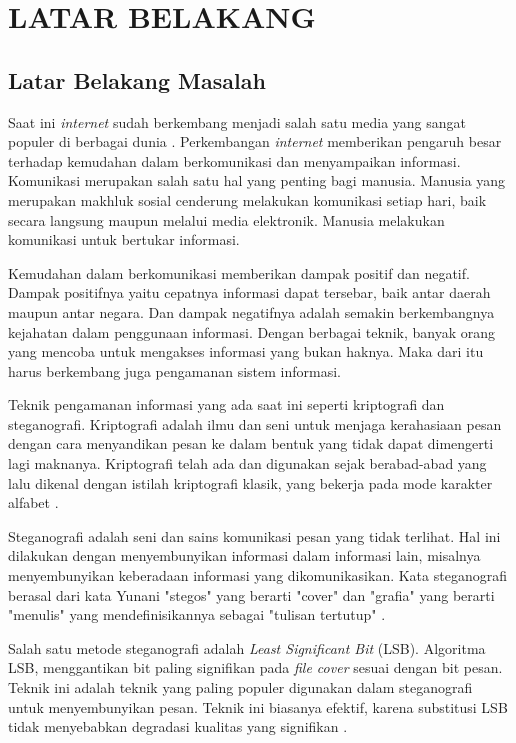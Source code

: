 
\chapter{LATAR BELAKANG}

\section{Latar Belakang Masalah}
Saat ini \emph{internet} sudah berkembang menjadi salah satu media yang sangat populer di berbagai dunia \cite{bunyamin}. Perkembangan \emph{internet} memberikan pengaruh besar terhadap kemudahan dalam berkomunikasi dan menyampaikan informasi. Komunikasi merupakan salah satu hal yang penting bagi manusia. Manusia yang merupakan makhluk sosial cenderung melakukan komunikasi setiap hari, baik secara langsung maupun melalui media elektronik. Manusia melakukan komunikasi untuk bertukar informasi.

Kemudahan dalam berkomunikasi memberikan dampak positif dan negatif. Dampak positifnya yaitu cepatnya informasi dapat tersebar, baik antar daerah maupun antar negara. Dan dampak negatifnya adalah semakin berkembangnya kejahatan dalam penggunaan informasi. Dengan berbagai teknik, banyak orang yang mencoba untuk mengakses informasi yang bukan haknya. Maka dari itu harus berkembang juga pengamanan sistem informasi.

Teknik pengamanan informasi yang ada saat ini seperti kriptografi dan steganografi. Kriptografi adalah ilmu dan seni untuk menjaga kerahasiaan pesan dengan cara menyandikan pesan  ke dalam bentuk yang tidak dapat dimengerti lagi maknanya. Kriptografi telah ada dan digunakan sejak berabad-abad yang lalu dikenal dengan istilah kriptografi klasik, yang bekerja pada mode karakter alfabet  \cite{rakhmat}.

Steganografi adalah seni dan sains komunikasi pesan yang tidak terlihat. Hal ini dilakukan dengan menyembunyikan informasi dalam informasi lain, misalnya menyembunyikan keberadaan informasi yang dikomunikasikan. Kata steganografi berasal dari kata Yunani "stegos" yang berarti "cover" dan "grafia" yang berarti "menulis" yang mendefinisikannya sebagai "tulisan tertutup" \cite{kadam}.

Salah satu metode steganografi adalah \emph{Least Significant Bit} (LSB). Algoritma LSB, menggantikan bit paling signifikan pada \emph{file cover} sesuai dengan bit pesan. Teknik ini adalah teknik yang paling populer digunakan dalam steganografi untuk menyembunyikan pesan. Teknik ini biasanya efektif, karena substitusi LSB tidak menyebabkan degradasi kualitas yang signifikan \cite{joshi}.

